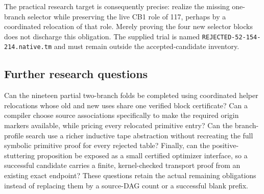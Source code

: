 The practical research target is consequently precise: realize the missing one-branch selector while preserving the live CB1 role of 117, perhaps by a coordinated relocation of that role. Merely proving the four new selector blocks does not discharge this obligation. The supplied trial is named \texttt{REJECTED-52-154-214.native.tm} and must remain outside the accepted-candidate inventory.

\subsection{Further research questions}

Can the nineteen partial two-branch folds be completed using coordinated helper relocations whose old and new uses share one verified block certificate? Can a compiler choose source associations specifically to make the required origin markers available, while pricing every relocated primitive entry? Can the branch-profile search use a richer inductive tape abstraction without recreating the full symbolic primitive proof for every rejected table? Finally, can the positive-stuttering proposition be exposed as a small certified optimizer interface, so a successful candidate carries a finite, kernel-checked transport proof from an existing exact endpoint? These questions retain the actual remaining obligations instead of replacing them by a source-DAG count or a successful blank prefix.
